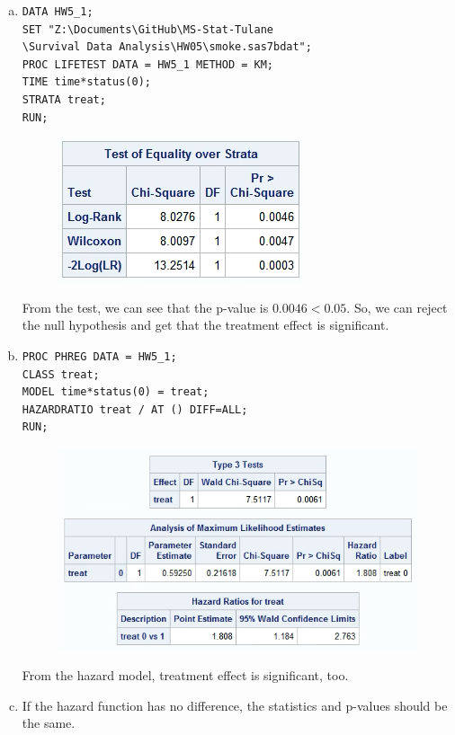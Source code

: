 \documentclass[12pt]{elegantbook}
\begin{document}
    \begin{solution}
        \begin{enumerate}[(a)]
            \item \begin{verbatim}
DATA HW5_1; 
SET "Z:\Documents\GitHub\MS-Stat-Tulane
\Survival Data Analysis\HW05\smoke.sas7bdat"; 
PROC LIFETEST DATA = HW5_1 METHOD = KM; 
TIME time*status(0); 
STRATA treat; 
RUN; 
            \end{verbatim}
            \begin{figure}[H]
                \centering
                \includegraphics[width=.25\textwidth]{HW5_1_1.png}
            \end{figure}
            From the test, we can see that the p-value is $0.0046<0.05$. So, we can reject the null hypothesis and get that the treatment effect is significant. 
            \item \begin{verbatim}
PROC PHREG DATA = HW5_1;
CLASS treat;
MODEL time*status(0) = treat;
HAZARDRATIO treat / AT () DIFF=ALL;
RUN;
            \end{verbatim}
            \begin{figure}[H]
                \centering
                \includegraphics[width=.6\textwidth]{HW5_1_2.png}
            \end{figure}
            From the hazard model, treatment effect is significant, too. 
            \item If the hazard function has no difference, the statistics and p-values should be the same.
        \end{enumerate}
    \end{solution}
\end{document}
